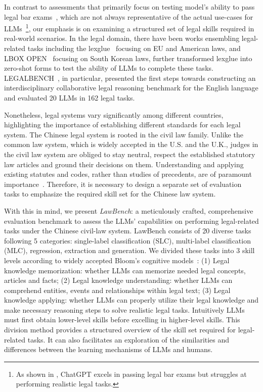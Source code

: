 In contrast to assessments that primarily focus on testing model's ability to pass legal bar exams~\cite{bommarito2022gpt,zhong2023agieval},  which are not always representative of the actual use-cases for LLMs~\footnote{As shown in \cite{chalkidis2022lexglue}, ChatGPT excels in passing legal bar exams but struggles at performing realistic legal tasks.}, our emphasis is on examining a structured set of legal skills required in real-world scenarios. In the legal domain, there have been works ensembling legal-related tasks including the lexglue~\cite{chalkidis2022lexglue} focusing on EU and American laws, and LBOX OPEN~\cite{hwang2022multi} focusing on South Korean laws, \cite{chalkidis2023chatgpt} further transformed lexglue into zero-shot forms to test the ability of LLMs to complete these tasks. LEGALBENCH~\cite{guha2023legalbench}, in particular, presented the first steps towards constructing an interdisciplinary collaborative legal reasoning benchmark for the English language and evaluated 20 LLMs in 162 legal tasks. 

Nonetheless, legal systems vary significantly among different countries, highlighting the importance of establishing different standards for each legal system. The Chinese legal system is rooted in the civil law family. Unlike the common law system, which is widely accepted in the U.S. and the U.K., judges in the civil law system are obliged to stay neutral, respect the established statutory law articles and ground their decisions on them. Understanding and applying existing statutes and codes, rather than studies of precedents, are of paramount importance~\cite{zheng1986china}. Therefore, it is necessary to design a separate set of evaluation tasks to emphasize the required skill set for the Chinese law system. 

With this in mind, we present \emph{LawBench}:  a meticulously crafted, comprehensive evaluation benchmark to assess the LLMs’ capabilities on performing legal-related tasks under the Chinese civil-law system. LawBench consists of 20 diverse tasks following 5 categories:  single-label classification (SLC), multi-label classification (MLC), regression, extraction and generation.
We divided these tasks into 3 skill levels according to widely accepted Bloom's cognitive models~\cite{krathwohl2002revision}: (1) Legal knowledge memorization: whether LLMs can memorize needed legal concepts, articles and facts; (2) Legal knowledge understanding: whether LLMs can comprehend entities, events and relationships within legal text; (3) Legal knowledge applying: whether LLMs can properly utilize their legal knowledge and make necessary reasoning steps to solve realistic legal tasks. Intuitively LLMs must first obtain lower-level skills before excelling in higher-level skills. This division method provides a structured overview of the skill set required for legal-related tasks. It can also facilitates an exploration of the similarities
and differences between the learning mechanisms of LLMs and humans.

